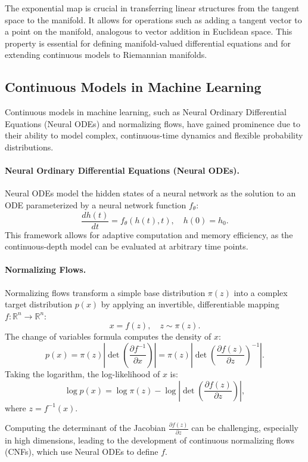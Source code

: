 \documentclass[a4paper,14pt]{article}
\theoremstyle{plain} %
\theoremstyle{definition} %
\theoremstyle{remark} %
\begin{document}
	The exponential map is crucial in transferring linear structures from the tangent space to the manifold. It allows for operations such as adding a tangent vector to a point on the manifold, analogous to vector addition in Euclidean space. This property is essential for defining manifold-valued differential equations and for extending continuous models to Riemannian manifolds.
	
	\subsection{Continuous Models in Machine Learning}
	
	Continuous models in machine learning, such as Neural Ordinary Differential Equations (Neural ODEs) and normalizing flows, have gained prominence due to their ability to model complex, continuous-time dynamics and flexible probability distributions.
	
	\paragraph{Neural Ordinary Differential Equations (Neural ODEs).} Neural ODEs model the hidden states of a neural network as the solution to an ODE parameterized by a neural network function $f_\theta$:
	\[
	\frac{dh(t)}{dt} = f_\theta(h(t), t), \quad h(0) = h_0.
	\]
	This framework allows for adaptive computation and memory efficiency, as the continuous-depth model can be evaluated at arbitrary time points.
	
	\paragraph{Normalizing Flows.} Normalizing flows transform a simple base distribution $\pi(z)$ into a complex target distribution $p(x)$ by applying an invertible, differentiable mapping $f: \mathbb{R}^n \rightarrow \mathbb{R}^n$:
	\[
	x = f(z), \quad z \sim \pi(z).
	\]
	The change of variables formula computes the density of $x$:
	\[
	p(x) = \pi(z) \left| \det \left( \frac{\partial f^{-1}}{\partial x} \right) \right| = \pi(z) \left| \det \left( \frac{\partial f(z)}{\partial z} \right)^{-1} \right|.
	\]
	Taking the logarithm, the log-likelihood of $x$ is:
	\[
	\log p(x) = \log \pi(z) - \log \left| \det \left( \frac{\partial f(z)}{\partial z} \right) \right|,
	\]
	where $z = f^{-1}(x)$.
	
	Computing the determinant of the Jacobian $\frac{\partial f(z)}{\partial z}$ can be challenging, especially in high dimensions, leading to the development of continuous normalizing flows (CNFs), which use Neural ODEs to define $f$.
	
\end{document}
